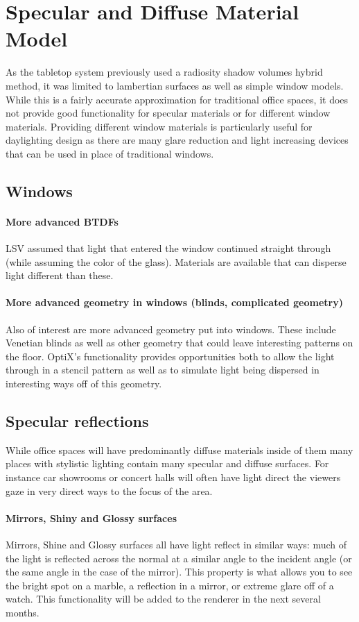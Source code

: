 \section{Specular and Diffuse Material Model}
  As the tabletop system previously used a radiosity shadow volumes hybrid method, it was limited to lambertian surfaces as well as simple window models.  While this is a fairly accurate approximation for traditional office spaces, it does not provide good functionality for specular materials or for different window materials.  Providing different window materials is particularly useful for daylighting design as there are many glare reduction and light increasing devices that can be used in place of traditional windows.
  \subsection{Windows}
    \paragraph{More advanced BTDFs}
    LSV assumed that light that entered the window continued straight through (while assuming the color of the glass).  Materials are available that can disperse light different than these.  
    \paragraph{More advanced geometry in windows (blinds, complicated geometry)}
    Also of interest are more advanced geometry put into windows.  These include Venetian blinds as well as other geometry that could leave interesting patterns on the floor.  OptiX's functionality provides opportunities both to allow the light through in a stencil pattern as well as to simulate light being dispersed in interesting ways off of this geometry.
  \subsection{Specular reflections}
  While office spaces will have predominantly diffuse materials inside of them many places with stylistic lighting contain many specular and diffuse surfaces.  For instance car showrooms or concert halls will often have light direct the viewers gaze in very direct ways to the focus of the area.
    \paragraph{Mirrors, Shiny and Glossy surfaces}
    Mirrors, Shine and Glossy surfaces all have light reflect in similar ways: much of the light is reflected across the normal at a similar angle to the incident angle (or the same angle in the case of the mirror).  This property is what allows you to see the bright spot on a marble, a reflection in a mirror, or extreme glare off of a watch.  This functionality will be added to the renderer in the next several months.  
